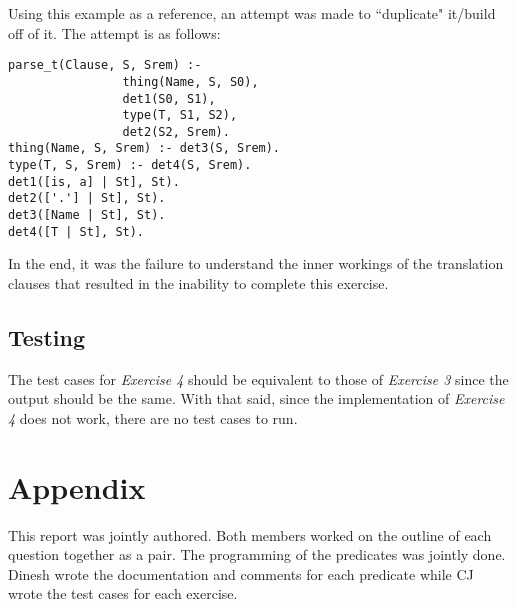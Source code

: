 \documentclass[11pt]{article}
\newcommand{\forceindent}{\leavevmode{\parindent=1em\indent}}
\begin{document}
Using this example as a reference, an attempt was made to ``duplicate" it/build off of it. The attempt is as follows:
\begin{lstlisting}[caption= Code Attempt for Exercise 4, label= Listing 17]
parse_t(Clause, S, Srem) :-    
                thing(Name, S, S0),
                det1(S0, S1),
                type(T, S1, S2),
                det2(S2, Srem).           
thing(Name, S, Srem) :- det3(S, Srem).
type(T, S, Srem) :- det4(S, Srem).
det1([is, a] | St], St).
det2(['.'] | St], St).
det3([Name | St], St).
det4([T | St], St).          	
\end{lstlisting}

In the end, it was the failure to understand the inner workings of the translation clauses that resulted in the inability to complete this exercise.

	\subsection{Testing}
\forceindent The test cases for \emph{Exercise 4} should be equivalent to those of \emph{Exercise 3} since the output should be the same. With that said, since the implementation of \emph{Exercise 4} does not work, there are no test cases to run.	

\section{Appendix}
This report was jointly authored. Both members worked on the outline of each 
question together as a pair. The programming of the predicates was jointly
done. Dinesh wrote the documentation and comments for each predicate while 
CJ wrote the test cases for each exercise.
\end{document}
